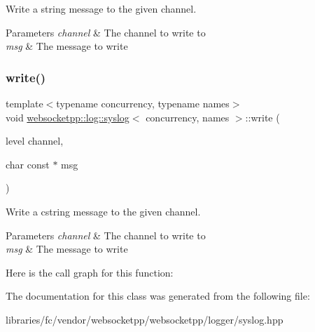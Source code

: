 Write a string message to the given channel. 


\begin{DoxyParams}{Parameters}
{\em channel} & The channel to write to \\
\hline
{\em msg} & The message to write \\
\hline
\end{DoxyParams}
\mbox{\label{classwebsocketpp_1_1log_1_1syslog_a2fda2d9b4aa71d4b47b7e93359b5b0d9}} 
\subsubsection{\texorpdfstring{write()}{write()}\hspace{0.1cm}{\footnotesize\ttfamily [2/2]}}
{\footnotesize\ttfamily template$<$typename concurrency, typename names$>$ \\
void \mbox{\hyperlink{classwebsocketpp_1_1log_1_1syslog}{websocketpp\+::log\+::syslog}}$<$ concurrency, names $>$\+::write (\begin{DoxyParamCaption}\item[{level}]{channel,  }\item[{char const $\ast$}]{msg }\end{DoxyParamCaption})\hspace{0.3cm}{\ttfamily [inline]}}



Write a cstring message to the given channel. 


\begin{DoxyParams}{Parameters}
{\em channel} & The channel to write to \\
\hline
{\em msg} & The message to write \\
\hline
\end{DoxyParams}
Here is the call graph for this function\+:


The documentation for this class was generated from the following file\+:\begin{DoxyCompactItemize}
\item 
libraries/fc/vendor/websocketpp/websocketpp/logger/syslog.\+hpp\end{DoxyCompactItemize}
